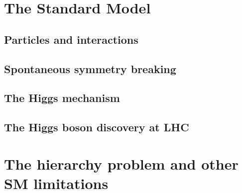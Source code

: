 \section{The Standard Model}
\label{sec:SMintro}

\subsection{Particles and interactions}
\subsection{Spontaneous symmetry breaking}
\subsection{The Higgs mechanism}
\subsection{The Higgs boson discovery at LHC}

\section{The hierarchy problem and other SM limitations}
\label{sec:SMintro2}

